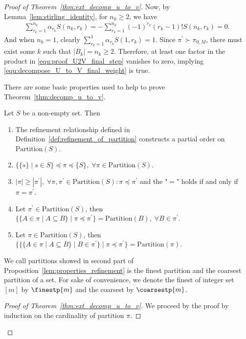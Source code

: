 \documentclass[letterpaper,11pt]{article}
\newcommand{\partition}{\mathrm{Partition}}
\newcommand{\partitionp}[1]{\partition(#1)}
\newcommand{\pleq}{\preceq}
\newcommand{\pgreater}{\succ}
\begin{document}
\begin{proof}[Proof of Theorem~\ref{thm:ext_decomp_u_to_v}]
Now, by Lemma~\ref{lem:stirling_identity}, for $n_k \geq 2$, we have
\begin{align*}
    \sum_{r_k =1}^{n_k} \alpha_{r_k} S(n_k, r_k) 
    =  - \sum_{r_k =1}^{n_k} (-1)^{r_k} (r_k -1)! S(n_k,r_k) = 0.
\end{align*}
And when $n_k = 1$, clearly $\sum_{r_k =1}^{1} \alpha_{r_k} S(1, r_k) = 1 $. Since $\pi^{\prime} \pgreater \pi_{0,M}$, there must exist some $k$ such that $| B_k | = n_k \geq 2$. Therefore, at least one factor in the product in \eqref{equ:proof_U2V_final_step} vanishes to zero, implying \eqref{equ:decompose_U_to_V_final_weight} is true.

There are some basic properties used to help to prove Theorem~\ref{thm:decomp_u_to_v}.
\begin{lemma}\label{lem:properties_refinement}
    Let $S$ be a non-empty set. Then
    \begin{enumerate}
        \item The refinement relationship defined in Definition~\ref{def:refinement_of_partition} constructs a partial order on $\partitionp{S}$.
        \item $\{\{s\} \mid s \in S\} \pleq \pi \pleq \{S\}, \; \forall \pi \in \partitionp{S}$. 
        \item $|\pi| \geq |\pi^\prime|, \; \forall \pi,\pi^\prime \in \partitionp{S}: \pi \pleq \pi^\prime$ and the "$=$" holds if and only if $\pi = \pi^\prime$.
        \item Let $\pi^\prime \in \partitionp{S}$, then $\{\{A \in \pi \mid A \subseteq B\} \mid \pi \pleq \pi^\prime\} = \partitionp{B}, \; \forall B \in \pi^\prime$. 
        \item Let $\pi \in \partitionp{S}$, then $\{\{\{ A \in \pi \mid A \subseteq B\} \mid B \in \pi^\prime\} \mid \pi \pleq \pi^\prime \} = \partitionp{\pi}$. 
    \end{enumerate}
\end{lemma}

\begin{remark}
    We call partitions showed in second part of Proposition~\ref{lem:properties_refinement} is the finest partition and the coarsest partition of a set. For sake of convenience, we denote the finest of integer set $[m]$ by $\finestp{m}$ and the coarsest by $\coarsestp{m}$.
\end{remark}
\begin{proof}[Proof of Theorem~\ref{thm:ext_decomp_u_to_v}]
    We proceed by the proof by induction on the cardinality of partition $\pi$. 
    

\end{proof}
\end{proof}
\end{document}
